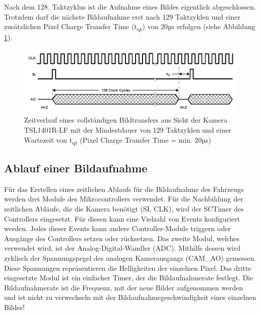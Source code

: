 Nach dem 128. Taktzyklus ist die Aufnahme eines Bildes eigentlich abgeschlossen. Trotzdem darf die nächste Bildaufnahme erst nach 129 Taktzyklen und einer zusätzlichen \glqq{}Pixel Charge Transfer Time\grqq{} (t\textsubscript{qt}) von 20µs erfolgen (siehe Abbildung \ref{fig:TimingWaveform}).

\begin{figure}[H] %
\includegraphics[width=.95\textwidth]{sec7/images/TimingWaveform} 
\centering
\captionsetup{width=.95\textwidth}
\caption[Zeitverlauf eines vollständigen Bildtransfers aus Sicht der Kamera ~\protect\cite{Taos}]{Zeitverlauf eines vollständigen Bildtransfers aus Sicht der Kamera TSL1401R-LF mit der Mindestdauer von 129 Taktzyklen und einer Wartezeit von t\textsubscript{qt} (\glqq{}Pixel Charge Transfer Time\grqq{} = min. 20µs)  ~\protect\cite{Taos}}\centering
\label{fig:TimingWaveform}
\end{figure}


\newpage
\subsection{Ablauf einer Bildaufnahme}\label{Sec7Sub2}

Für das Erstellen eines zeitlichen Ablaufs für die Bildaufnahme des Fahrzeugs werden drei Module des Mikrocontrollers verwendet. Für die Nachbildung der zeitlichen Abläufe, die die Kamera benötigt (SI, CLK), wird der SCTimer des Controllers eingesetzt. Für diesen kann eine Vielzahl von Events konfiguriert werden. Jedes dieser Events kann andere Controller-Module triggern oder Ausgänge des Controllers setzen oder rücksetzen. Das zweite Modul, welches verwendet wird, ist der Analog-Digital-Wandler (ADC). Mithilfe dessen wird zyklisch der Spannungspegel des analogen Kamerausgangs (CAM\_AO) gemessen. Diese Spannungen repräsentieren die Helligkeiten der einzelnen Pixel. Das dritte eingesetzte Modul ist ein einfacher Timer, der die Bildaufnahmerate festlegt. Die Bildaufnahmerate ist die Frequenz, mit der neue Bilder aufgenommen werden und ist nicht zu verwechseln mit der Bildaufnahmegeschwindigkeit eines einzelnen Bildes!\vspace{11pt}

